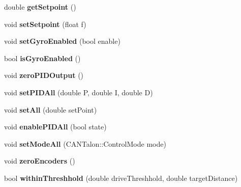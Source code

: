 \begin{DoxyCompactItemize}
\item 
\hypertarget{class_drive_bae_aaf5602f89bd043412f984251d458e74e}{}double {\bfseries get\+Setpoint} ()\label{class_drive_bae_aaf5602f89bd043412f984251d458e74e}

\item 
\hypertarget{class_drive_bae_a1b22dfabc63aa778c4a5d7eeef1c02e1}{}void {\bfseries set\+Setpoint} (float f)\label{class_drive_bae_a1b22dfabc63aa778c4a5d7eeef1c02e1}

\item 
\hypertarget{class_drive_bae_af8fc09ba2643e2813f46435592b86b3a}{}void {\bfseries set\+Gyro\+Enabled} (bool enable)\label{class_drive_bae_af8fc09ba2643e2813f46435592b86b3a}

\item 
\hypertarget{class_drive_bae_aa43736f6a503bac3f7bfb968a318e831}{}bool {\bfseries is\+Gyro\+Enabled} ()\label{class_drive_bae_aa43736f6a503bac3f7bfb968a318e831}

\item 
\hypertarget{class_drive_bae_a4b480bb19d803cffa8bac5fc3693bc1d}{}void {\bfseries zero\+P\+I\+D\+Output} ()\label{class_drive_bae_a4b480bb19d803cffa8bac5fc3693bc1d}

\item 
\hypertarget{class_drive_bae_a9e669140b1e6f1bd467a89df6fa1fed4}{}void {\bfseries set\+P\+I\+D\+All} (double P, double I, double D)\label{class_drive_bae_a9e669140b1e6f1bd467a89df6fa1fed4}

\item 
\hypertarget{class_drive_bae_abe2f4a4de059ac1479a165a07994a33c}{}void {\bfseries set\+All} (double set\+Point)\label{class_drive_bae_abe2f4a4de059ac1479a165a07994a33c}

\item 
\hypertarget{class_drive_bae_a210429543400fa3789576b1591ec4179}{}void {\bfseries enable\+P\+I\+D\+All} (bool state)\label{class_drive_bae_a210429543400fa3789576b1591ec4179}

\item 
\hypertarget{class_drive_bae_a7b6936f81aa8249e36998f3e371d44d9}{}void {\bfseries set\+Mode\+All} (C\+A\+N\+Talon\+::\+Control\+Mode mode)\label{class_drive_bae_a7b6936f81aa8249e36998f3e371d44d9}

\item 
\hypertarget{class_drive_bae_a332eee2604b94a0a79af935242d7e260}{}void {\bfseries zero\+Encoders} ()\label{class_drive_bae_a332eee2604b94a0a79af935242d7e260}

\item 
\hypertarget{class_drive_bae_a547909d641c7a890c427b154f982322d}{}bool {\bfseries within\+Threshhold} (double drive\+Threshhold, double target\+Distance)\label{class_drive_bae_a547909d641c7a890c427b154f982322d}


\end{DoxyCompactItemize}
